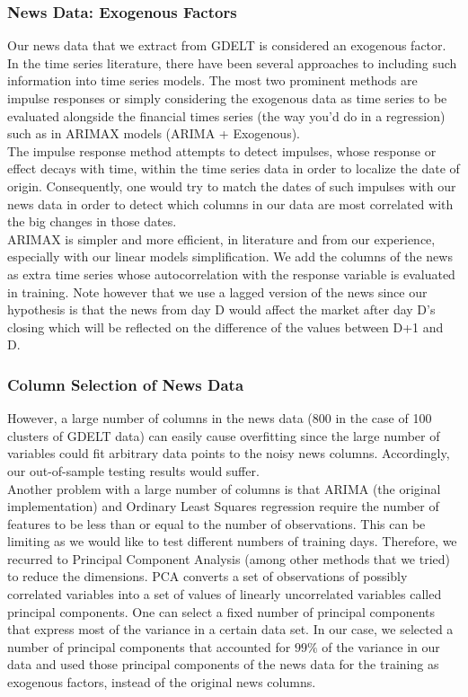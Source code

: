 \subsubsection{News Data: Exogenous Factors}
Our news data that we extract from GDELT is considered an exogenous factor. In the time series literature, there have been several approaches to including such information into time series models. The most two prominent methods are impulse responses or simply considering the exogenous data as time series to be evaluated alongside the financial times series (the way you'd do in a regression) such as in ARIMAX models (ARIMA + Exogenous).\\
The impulse response method attempts to detect impulses, whose response or effect decays with time,  within the time series data in order to localize the date of origin. Consequently, one would try to match the dates of such impulses with our news data in order to detect which columns in our data are most correlated with the big changes in those dates.\\
ARIMAX is simpler and more efficient, in literature and from our experience, especially with our linear models simplification. We add the columns of the news as extra time series whose autocorrelation with the response variable is evaluated in training. Note however that we use a lagged version of the news since our hypothesis is that the news from day D would affect the market after day D's closing which will be reflected on the difference of the values between D+1 and D.\\
\subsubsection{Column Selection of News Data}
However, a large number of columns in the news data (800 in the case of 100 clusters of GDELT data) can easily cause overfitting since the large number of variables could fit arbitrary data points to the noisy news columns. Accordingly, our out-of-sample testing results would suffer.\\
Another problem with a large number of columns is that ARIMA (the original implementation) and Ordinary Least Squares regression require the number of features to be less than or equal to the number of observations. This can be limiting as we would like to test different numbers of training days. Therefore, we recurred to Principal Component Analysis (among other methods that we tried) to reduce the dimensions. PCA converts a set of observations of possibly correlated variables into a set of values of linearly uncorrelated variables called principal components.\cite{PCA} One can select a fixed number of principal components that express most of the variance in a certain data set. In our case, we selected a number of principal components that accounted for $99\%$ of the variance in our data and used those principal components of the news data for the training as exogenous factors, instead of the original news columns. \\
